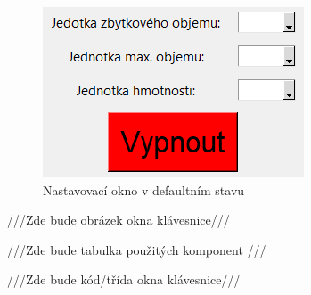 
\begin{figure}[!h]
    \begin{center}
        \includegraphics[scale=2]{obrazky/settings_okno.PNG}
    \end{center}
    \caption{Nastavovací okno v defaultním stavu}
    \label{putty}
\end{figure}


///Zde bude obrázek okna klávesnice///

///Zde bude tabulka použitých komponent ///

///Zde bude kód/třída okna klávesnice///